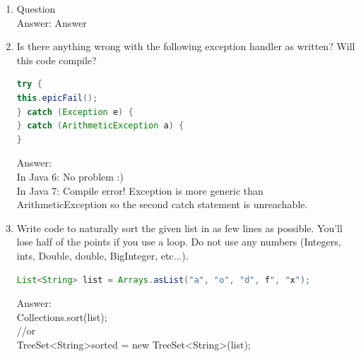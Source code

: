 \documentclass[11pt]{article}
\newenvironment{answer}{\large\lstset{basicstyle=\large\ttfamily}\color{white} \small{Answer:}}{}
\newenvironment{answer}{\large\lstset{basicstyle=\large\ttfamily}\color{red} \small{Answer:}}{}
\begin{document}
\begin{enumerate}
\item Question \\
\begin{answer}
Answer
\end{answer}



\item Is there anything wrong with the following exception handler as written? Will this
code compile? 
\begin{lstlisting}[language=java]
try {
this.epicFail();
} catch (Exception e) {
} catch (ArithmeticException a) {
}
\end{lstlisting}
\begin{answer}
\\ In Java 6: No problem :)
\\ In Java 7: Compile error!  Exception is more generic than ArithmeticException so the second catch statement is unreachable.
\end{answer}



\item Write code to naturally sort the given list in as few lines as possible. You'll lose half
of the points if you use a loop. Do not use any numbers (Integers, ints, Double, double,
BigInteger, etc...).
\begin{lstlisting}[language=java]
List<String> list = Arrays.asList("a", "o", "d", f", "x");
\end{lstlisting}
\begin{answer}
\\Collections.sort(list);
\\//or
\\TreeSet\textless String\textgreater  sorted = new TreeSet\textless String\textgreater (list);
\end{answer}



\end{enumerate}
\end{document}
